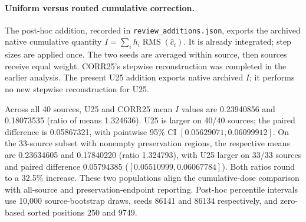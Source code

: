 \paragraph{Uniform versus routed cumulative correction.}
The post-hoc addition, recorded in \texttt{review\_additions.json}, exports the archived native cumulative quantity $I=\sum_i h_i\operatorname{RMS}(\widehat c_i)$. It is already integrated; step sizes are applied once. The two seeds are averaged within source, then sources receive equal weight. CORR25's stepwise reconstruction was completed in the earlier analysis. The present U25 addition exports native archived $I$; it performs no new stepwise reconstruction for U25.

Across all 40 sources, U25 and CORR25 mean $I$ values are 0.23940856 and 0.18073535 (ratio of means 1.324636). U25 is larger on 40/40 sources; the paired difference is 0.05867321, with pointwise 95\% CI $[0.05629071,0.06099912]$. On the 33-source subset with nonempty preservation regions, the respective means are 0.23634605 and 0.17840220 (ratio 1.324793), with U25 larger on 33/33 sources and paired difference 0.05794385 ($[0.05510999,0.06067784]$). Both ratios round to a 32.5\% increase. These two populations align the cumulative-dose comparison with all-source and preservation-endpoint reporting. Post-hoc percentile intervals use 10,000 source-bootstrap draws, seeds 86141 and 86134 respectively, and zero-based sorted positions 250 and 9749.
